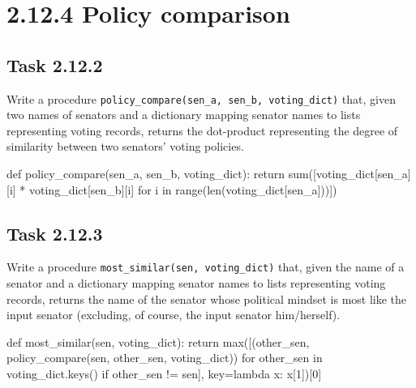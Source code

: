 \documentclass[
  letterpaper,
  DIV=11,
  numbers=noendperiod]{scrartcl}
\newenvironment{Shaded}{\begin{snugshade}}{\end{snugshade}}
\newcommand{\BuiltInTok}[1]{\textcolor[rgb]{0.00,0.23,0.31}{#1}}
\newcommand{\ControlFlowTok}[1]{\textcolor[rgb]{0.00,0.23,0.31}{#1}}
\newcommand{\DecValTok}[1]{\textcolor[rgb]{0.68,0.00,0.00}{#1}}
\newcommand{\KeywordTok}[1]{\textcolor[rgb]{0.00,0.23,0.31}{#1}}
\newcommand{\NormalTok}[1]{\textcolor[rgb]{0.00,0.23,0.31}{#1}}
\newcommand{\OperatorTok}[1]{\textcolor[rgb]{0.37,0.37,0.37}{#1}}
\begin{document}
\hypertarget{policy-comparison}{%
\section{2.12.4 Policy comparison}\label{policy-comparison}}

\hypertarget{task-2.12.2}{%
\subsection{Task 2.12.2}\label{task-2.12.2}}

Write a procedure
\texttt{policy\_compare(sen\_a,\ sen\_b,\ voting\_dict)} that, given two
names of senators and a dictionary mapping senator names to lists
representing voting records, returns the dot-product representing the
degree of similarity between two senators' voting policies.

\begin{Shaded}
\begin{Highlighting}[numbers=left,,]
\KeywordTok{def}\NormalTok{ policy\_compare(sen\_a, sen\_b, voting\_dict): }\ControlFlowTok{return} \BuiltInTok{sum}\NormalTok{([voting\_dict[sen\_a][i] }\OperatorTok{*}\NormalTok{ voting\_dict[sen\_b][i] }\ControlFlowTok{for}\NormalTok{ i }\KeywordTok{in} \BuiltInTok{range}\NormalTok{(}\BuiltInTok{len}\NormalTok{(voting\_dict[sen\_a]))])}
\end{Highlighting}
\end{Shaded}

\hypertarget{task-2.12.3}{%
\subsection{Task 2.12.3}\label{task-2.12.3}}

Write a procedure \texttt{most\_similar(sen,\ voting\_dict)} that, given
the name of a senator and a dictionary mapping senator names to lists
representing voting records, returns the name of the senator whose
political mindset is most like the input senator (excluding, of course,
the input senator him/herself).

\begin{Shaded}
\begin{Highlighting}[numbers=left,,]
\KeywordTok{def}\NormalTok{ most\_similar(sen, voting\_dict): }\ControlFlowTok{return} \BuiltInTok{max}\NormalTok{([(other\_sen, policy\_compare(sen, other\_sen, voting\_dict)) }\ControlFlowTok{for}\NormalTok{ other\_sen }\KeywordTok{in}\NormalTok{ voting\_dict.keys() }\ControlFlowTok{if}\NormalTok{ other\_sen }\OperatorTok{!=}\NormalTok{ sen], key}\OperatorTok{=}\KeywordTok{lambda}\NormalTok{ x: x[}\DecValTok{1}\NormalTok{])[}\DecValTok{0}\NormalTok{]}
\end{Highlighting}
\end{Shaded}
\end{document}

